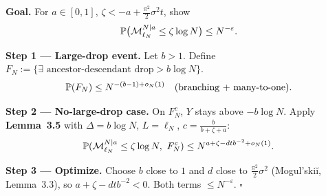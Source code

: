 \small
\textbf{Goal.} For $a\in[0,1]$, $\zeta<-a+\frac{\pi^2}{2}\sigma^2t$, show
\[
    \P\bigl(\mathcal M^{N|a}_{\ell_N}\le\zeta\log N\bigr)\le N^{-\varepsilon}.
\]

\medskip
\textbf{Step 1 --- Large-drop event.}
Let $b>1$. Define $F_N:=\{\exists\text{ ancestor-descendant drop}>b\log N\}$.
\[
    \P(F_N)\le N^{-(b-1)+o_N(1)}\quad\text{(branching + many-to-one).}
\]

\medskip
\textbf{Step 2 --- No-large-drop case.}
On $F_N^c$, $Y$ stays above $-b\log N$. Apply \textbf{Lemma~3.5} with
$\Delta=b\log N$, $L=\ell_N$, $c=\frac{b}{b+\zeta+a}$:
\[
    \P(\mathcal M^{N|a}_{\ell_N}\le\zeta\log N,\ F_N^c)
    \le N^{a+\zeta-dtb^{-2}+o_N(1)}.
\]

\medskip
\textbf{Step 3 --- Optimize.}
Choose $b$ close to $1$ and $d$ close to $\frac{\pi^2}{2}\sigma^2$
(Mogul'ski\u{i}, Lemma~3.3), so $a+\zeta-dtb^{-2}<0$.
Both terms $\le N^{-\varepsilon}$. $\square$
